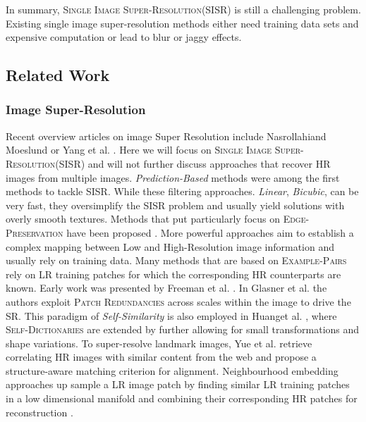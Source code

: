 \documentclass[12pt]{article}
\begin{document}
			In summary, \textsc{Single Image Super-Resolution}(SISR) is still a challenging problem. Existing single image super-resolution methods either need training data sets and expensive computation or lead to blur or jaggy effects.
		\subsection{Related Work}
			\subsubsection{Image Super-Resolution}
				Recent overview articles on image Super Resolution include Nasrollahiand Moeslund \cite{6} or Yang et al. \cite{7}. Here we will focus on \textsc{Single Image Super-Resolution}(SISR) and will not further discuss approaches that recover HR images from multiple images. \textit{Prediction-Based} methods were among the first methods to tackle SISR. While these filtering approaches. \textit{Linear}, \textit{Bicubic}, can be very fast, they oversimplify the SISR problem and usually yield solutions with overly smooth textures. Methods that put particularly focus on \textsc{Edge-Preservation} have been proposed \cite{8}. More powerful approaches aim to establish a complex mapping between Low and High-Resolution image information and usually rely on training data. Many methods that are based on \textsc{Example-Pairs} rely on LR training patches for which the corresponding HR counterparts are known. Early work was presented by Freeman et al. \cite{9}\cite{10}. In Glasner et al. \cite{11} the authors exploit \textsc{Patch Redundancies} across scales within the image to drive the SR. This paradigm of \textit{Self-Similarity} is also employed in Huanget al. \cite{12}, where \textsc{Self-Dictionaries} are extended by further allowing for small transformations and shape variations. To super-resolve landmark images, Yue et al. \cite{13} retrieve correlating HR images with similar content from the web and propose a structure-aware matching criterion for alignment. Neighbourhood embedding approaches up sample a LR image patch by finding similar LR training patches in a low dimensional manifold and combining their corresponding HR patches for reconstruction \cite{14}\cite{15}.
\end{document}
